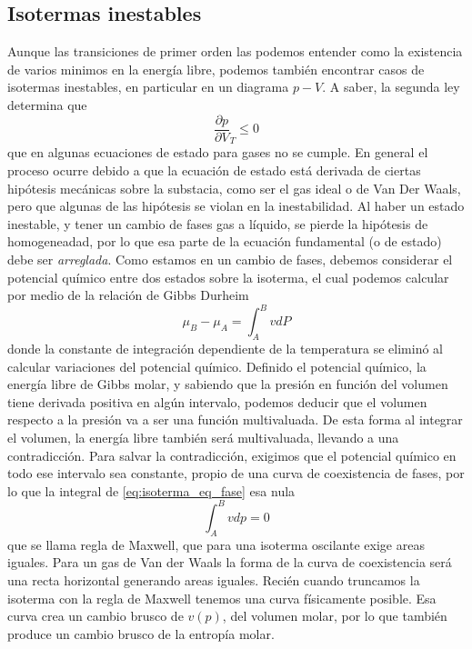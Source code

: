 \subsection{Isotermas inestables}
Aunque las transiciones de primer orden las podemos entender como la existencia de varios minimos en la energía libre, podemos también encontrar casos de isotermas inestables, en particular en un diagrama $p-V$.
A saber, la segunda ley determina que
\[ \frac{\partial p}{\partial V}_T \leq 0\]
que en algunas ecuaciones de estado para gases no se cumple.
En general el proceso ocurre debido a que la ecuación de estado está derivada de ciertas hipótesis mecánicas sobre la substacia, como ser el gas ideal o de Van Der Waals, pero que algunas de las hipótesis se violan en la inestabilidad.
Al haber un estado inestable, y tener un cambio de fases gas a líquido, se pierde la hipótesis de homogeneadad, por lo que esa parte de la ecuación fundamental (o de estado) debe ser \emph{arreglada}.
Como estamos en un cambio de fases, debemos considerar el potencial químico entre dos estados sobre la isoterma, el cual podemos calcular por medio de la relación de Gibbs Durheim
\begin{equation}
\mu_B - \mu_A = \int^B_A v dP
\label{eq:isoterma_eq_fase}
\end{equation}
donde la constante de integración dependiente de la temperatura se eliminó al calcular variaciones del potencial químico.
Definido el potencial químico, la energía libre de Gibbs molar, y sabiendo que la presión en función del volumen tiene derivada positiva en algún intervalo, podemos deducir que el volumen respecto a la presión va a ser una función multivaluada.
De esta forma al integrar el volumen, la energía libre también será multivaluada, llevando a una contradicción.
Para salvar la contradicción, exigimos que el potencial químico en todo ese intervalo sea constante, propio de una curva de coexistencia de fases, por lo que la integral de \ref{eq:isoterma_eq_fase} esa nula
\begin{equation}
\int^B_A v dp = 0
\label{eq:regla_maxwell}
\end{equation}
que se llama regla de Maxwell, que para una isoterma oscilante exige areas iguales.
Para un gas de Van der Waals la forma de la curva de coexistencia será una recta horizontal generando areas iguales.
Recién cuando truncamos la isoterma con la regla de Maxwell tenemos una curva físicamente posible.
Esa curva crea un cambio brusco de $v(p)$, del volumen molar, por lo que también produce un cambio brusco de la entropía molar.
